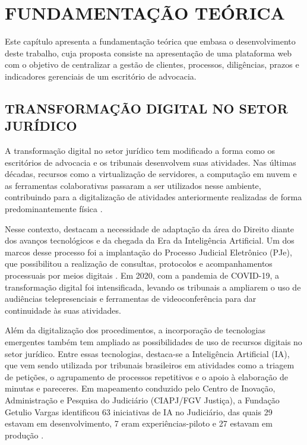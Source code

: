 \chapter{FUNDAMENTAÇÃO TEÓRICA}

Este capítulo apresenta a fundamentação teórica que embasa o desenvolvimento deste trabalho, cuja proposta consiste na apresentação de uma plataforma web com o objetivo de centralizar a gestão de clientes, processos, diligências, prazos e indicadores gerenciais de um escritório de advocacia.

\section{TRANSFORMAÇÃO DIGITAL NO SETOR JURÍDICO}

A transformação digital no setor jurídico tem modificado a forma como os escritórios de advocacia e os tribunais desenvolvem suas atividades. Nas últimas décadas, recursos como a virtualização de servidores, a computação em nuvem e as ferramentas colaborativas passaram a ser utilizados nesse ambiente, contribuindo para a digitalização de atividades anteriormente realizadas de forma predominantemente física \cite{pimenta2024}.

Nesse contexto,  destacam a necessidade de adaptação da área do Direito diante dos avanços tecnológicos e da chegada da Era da Inteligência Artificial. Um dos marcos desse processo foi a implantação do Processo Judicial Eletrônico (PJe), que possibilitou a realização de consultas, protocolos e acompanhamentos processuais por meios digitais \cite{rolimneto2025}. Em 2020, com a pandemia de COVID-19, a transformação digital foi intensificada, levando os tribunais a ampliarem o uso de audiências telepresenciais e ferramentas de videoconferência para dar continuidade às suas atividades.

Além da digitalização dos procedimentos, a incorporação de tecnologias emergentes também tem ampliado as possibilidades de uso de recursos digitais no setor jurídico. Entre essas tecnologias, destaca-se a Inteligência Artificial (IA), que vem sendo utilizada por tribunais brasileiros em atividades como a triagem de petições, o agrupamento de processos repetitivos e o apoio à elaboração de minutas e pareceres. Em mapeamento conduzido pelo Centro de Inovação, Administração e Pesquisa do Judiciário (CIAPJ/FGV Justiça), a Fundação Getulio Vargas identificou 63 iniciativas de IA no Judiciário, das quais 29 estavam em desenvolvimento, 7 eram experiências-piloto e 27 estavam em produção \cite{fgv2020}.


